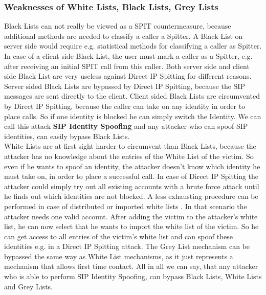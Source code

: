 \documentclass[final
	]{issa}
\begin{document}
\subsubsection{Weaknesses of White Lists, Black Lists, Grey Lists}
Black Lists can not really be viewed as a SPIT countermeasure, because additional methods are needed to classify a caller a Spitter. A Black List on server side would require e.g. statistical methods for classifying a caller as Spitter. In case of a client side Black List, the user must mark a caller as a Spitter, e.g. after receiving an initial SPIT call from this caller.
Both server side and client side Black List are very useless against Direct IP Spitting for different reasons. Server sided Black Lists are bypassed by Direct IP Spitting, because the SIP messages are sent directly to the client. Client sided Black Lists are circumvented by Direct IP Spitting, because the caller can take on any identity in order to place calls. So if one identity is blocked he can simply switch the Identity. We can call this attack \textbf{SIP Identity Spoofing} and any attacker who can spoof SIP identities, can easily bypass Black Lists.\\
White Lists are at first sight harder to circumvent than Black Lists, because the attacker has no knowledge about the entries of the White List of the victim. So even if he wants to spoof an identity, the attacker doesn't know which identity he must take on, in order to place a successful call. In case of Direct IP Spitting the attacker could simply try out all existing accounts with a brute force attack until he finds out which identities are not blocked. A less exhausting procedure can be performed in case of distributed or imported white lists \cite{paper:SPITreach}. In that scenario the attacker needs one valid account. After adding the victim to the attacker's white list, he can now select that he wants to import the white list of the victim. So he can get access to all entries of the victim's white list and can spoof these identities e.g. in a Direct IP Spitting attack.
The Grey List mechanism can be bypassed the same way as White List mechanisms, as it just represents a mechanism that allows first time contact. All in all we can say, that any attacker who is able to perform SIP Identity Spoofing, can bypass Black Lists, White Lists and Grey Lists.\\
\end{document}
